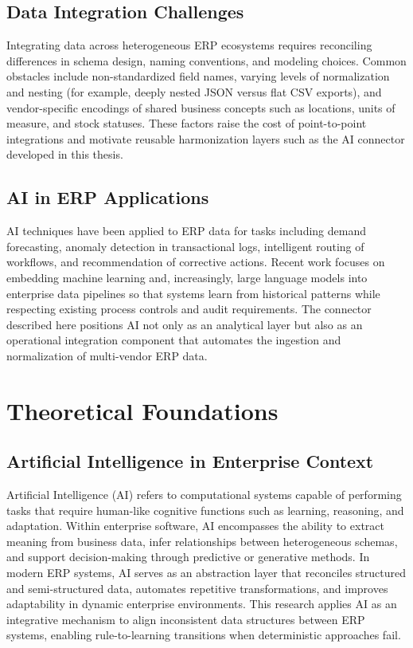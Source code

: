\documentclass{article}
\begin{document}
\subsection{Data Integration Challenges}
Integrating data across heterogeneous ERP ecosystems requires reconciling differences in schema
design, naming conventions, and modeling choices.\autocite{doan2012principles}
Common obstacles include non-standardized field names, varying levels of normalization and
nesting (for example, deeply nested JSON versus flat CSV exports), and vendor-specific
encodings of shared business concepts such as locations, units of measure, and stock
statuses.\autocite{skyvia2026patterns,tacnode2026patterns}
These factors raise the cost of point-to-point integrations and motivate reusable
harmonization layers such as the AI connector developed in this thesis.

\subsection{AI in ERP Applications}
AI techniques have been applied to ERP data for tasks including demand forecasting, anomaly
detection in transactional logs, intelligent routing of workflows, and recommendation of
corrective actions.\autocite{zhang2021aienterprise,hyndman2018forecasting}
Recent work focuses on embedding machine learning and, increasingly, large language models into
enterprise data pipelines so that systems learn from historical patterns while respecting
existing process controls and audit requirements.\autocite{brown2020language,zhao2023survey}
The connector described here positions AI not only as an analytical layer but also as an
operational integration component that automates the ingestion and normalization of
multi-vendor ERP data.

\section{Theoretical Foundations}

\subsection{Artificial Intelligence in Enterprise Context}
Artificial Intelligence (AI) refers to computational systems capable of performing tasks that
require human-like cognitive functions such as learning, reasoning, and
adaptation.\autocite{russell2010artificial}
Within enterprise software, AI encompasses the ability to extract meaning from business data,
infer relationships between heterogeneous schemas, and support decision-making through
predictive or generative methods.
In modern ERP systems, AI serves as an abstraction layer that reconciles structured and
semi-structured data, automates repetitive transformations, and improves adaptability in
dynamic enterprise environments.\autocite{zhang2021aienterprise}
This research applies AI as an integrative mechanism to align inconsistent data structures
between ERP systems, enabling rule-to-learning transitions when deterministic approaches fail.
\end{document}
